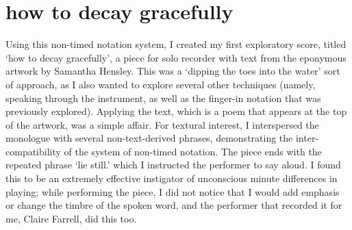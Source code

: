 \section{how to decay gracefully}

Using this non-timed notation system, I created my first exploratory score, titled `how to decay gracefully', a piece for solo recorder with text from the eponymous artwork by Samantha Hensley.
This was a `dipping the toes into the water' sort of approach, as I also wanted to explore several other techniques (namely, speaking through the instrument, as well as the finger-in notation that was previously explored). 
Applying the text, which is a poem that appears at the top of the artwork, was a simple affair. 
For textural interest, I interspersed the monologue with several non-text-derived phrases, demonstrating the inter-compatibility of the system of non-timed notation.
The piece ends with the repeated phrase `lie still.' which I instructed the performer to say aloud. 
I found this to be an extremely effective instigator of unconscious minute differences in playing; 
while performing the piece, I did not notice that I would add emphasis or change the timbre of the spoken word, and the performer that recorded it for me, Claire Farrell, did this too.
